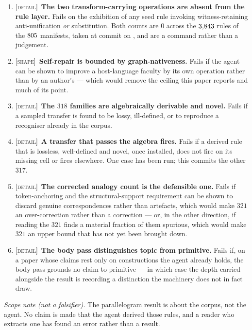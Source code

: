 \documentclass[11pt,a4paper]{article}
\theoremstyle{remark}
\begin{document}
\begin{enumerate}[leftmargin=*]
\item \textsc{[detail]}~\textbf{The two transform-carrying operations are absent from the rule layer.}
Fails on the exhibition of any seed rule invoking witness-retaining anti-unification \emph{or}
substitution. Both counts are $0$ across the $3{,}843$ rules of the $805$ manifests, taken at
commit \countsCommit{} on \countsReadOn, and are a command rather than a judgement.
\item \textsc{[shape]}~\textbf{Self-repair is bounded by graph-nativeness.} Fails if the agent can be
shown to improve a host-language faculty by its own operation rather than by an author's --- which
would remove the ceiling this paper reports and much of its point.
\item \textsc{[detail]}~\textbf{The $318$ families are algebraically derivable and novel.} Fails if a
sampled transfer is found to be lossy, ill-defined, or to reproduce a recogniser already in the corpus.
\item \textsc{[detail]}~\textbf{A transfer that passes the algebra fires.} Fails if a derived rule that
is lossless, well-defined and novel, once installed, does not fire on its missing cell or fires
elsewhere. One case has been run; this commits the other $317$.
\item \textsc{[detail]}~\textbf{The corrected analogy count is the defensible one.} Fails if
token-anchoring and the structural-support requirement can be shown to discard genuine correspondences
rather than artefacts, which would make $321$ an over-correction rather than a correction --- or, in
the other direction, if reading the $321$ finds a material fraction of them spurious, which would make
$321$ an upper bound that has not yet been brought down.
\item \textsc{[detail]}~\textbf{The body pass distinguishes topic from primitive.} Fails if, on a paper
whose claims rest only on constructions the agent already holds, the body pass grounds no claim to
primitive --- in which case the depth carried alongside the result is recording a distinction the
machinery does not in fact draw.
\end{enumerate}

\noindent\emph{Scope note (not a falsifier).} The parallelogram result is about the corpus, not the
agent. No claim is made that the agent derived those rules, and a reader who extracts one has found an
error rather than a result.
\end{document}
